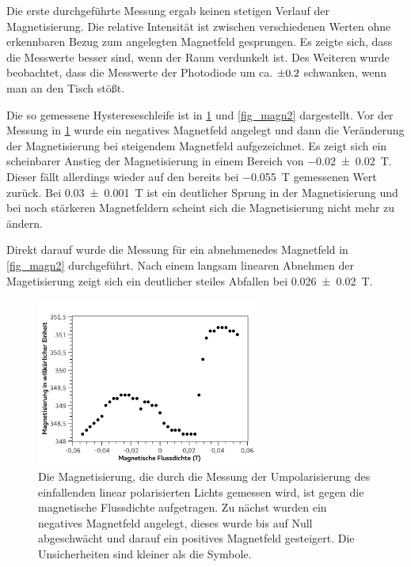 \documentclass[
	a4paper,
	12pt,
	pagesize,
	ngerman
]{scrartcl}
\begin{document}
	Die erste durchgeführte Messung ergab keinen stetigen Verlauf der Magnetisierung.
	Die relative Intensität ist zwischen verschiedenen Werten ohne erkennbaren Bezug zum angelegten Magnetfeld gesprungen.
	Es zeigte sich, dass die Messwerte besser sind, wenn der Raum verdunkelt ist.
	Des Weiteren wurde beobachtet, dass die Messwerte der Photodiode um ca. $\SI{\pm0,2}{}$ schwanken, wenn man an den Tisch stößt. %

	Die so gemessene Hystereseschleife ist in \cref{fig_magn1} und \cref{fig_magn2} dargestellt.
	Vor der Messung in \cref{fig_magn1} wurde ein negatives Magnetfeld angelegt und dann die Veränderung der Magnetisierung bei steigendem Magnetfeld aufgezeichnet.
	Es zeigt sich ein scheinbarer Anstieg der Magnetisierung in einem Bereich von \SI{-0,02+-0,02}{T}. 
	Dieser fällt allerdings wieder auf den bereits bei \SI{-0,055}{T} gemessenen Wert zurück.
	Bei \SI{0,03+-0,001}{T} ist ein deutlicher Sprung in der Magnetisierung und bei noch stärkeren Magnetfeldern scheint sich die Magnetisierung nicht mehr zu ändern.

	Direkt darauf wurde die Messung für ein abnehmenedes Magnetfeld in \cref{fig_magn2} durchgeführt.
	Nach einem langsam linearen Abnehmen der Magetisierung zeigt sich ein deutlicher steiles Abfallen bei \SI{0,026+-0,02}{T}.
	

	
	\begin{figure}[H] 
		\includegraphics[width=0.65\textwidth]{fig_magn1}
		\centering
		\caption{Die Magnetisierung, die durch die Messung der Umpolarisierung des einfallenden linear polarisierten Lichts gemessen wird, ist gegen die magnetische Flussdichte aufgetragen. 
		Zu nächst wurden ein negatives Magnetfeld angelegt, dieses wurde bis auf Null abgeschwächt und darauf ein positives Magnetfeld gesteigert. 
		Die Unsicherheiten sind kleiner als die Symbole.} 
		\label{fig_magn1}
		\centering
	\end{figure}
\end{document}
